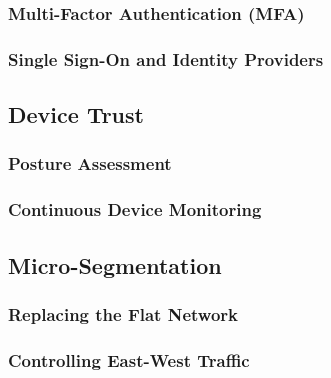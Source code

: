 \documentclass[12pt, letterpaper]{article}
\begin{document}
    \subsubsection{Multi-Factor Authentication (MFA)}

    \subsubsection{Single Sign-On and Identity Providers}

\subsection{Device Trust}

    \subsubsection{Posture Assessment}

    \subsubsection{Continuous Device Monitoring}

\subsection{Micro-Segmentation}

    \subsubsection{Replacing the Flat Network}

    \subsubsection{Controlling East-West Traffic}
\end{document}
